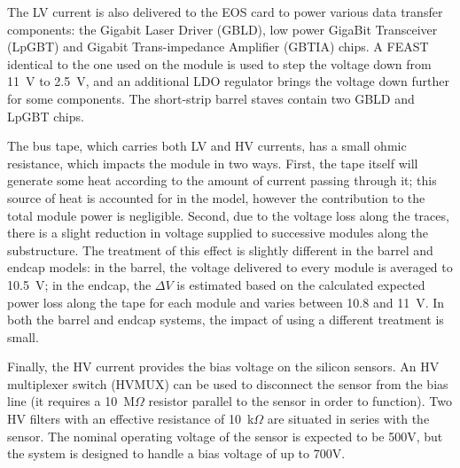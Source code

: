 The LV current is also delivered to the EOS card to power various data transfer components:
the Gigabit Laser Driver (GBLD), low power GigaBit Transceiver (LpGBT) and Gigabit Trans-impedance Amplifier (GBTIA) chips.
A FEAST identical to the one used on the module is used to step the
voltage down from 11~V to 2.5~V, and an additional LDO regulator brings the voltage down further for some components.
The short-strip barrel staves contain two GBLD and LpGBT chips.

The bus tape, which carries both LV and HV currents, has a small ohmic resistance, which impacts the
module in two ways. First,
the tape itself will generate some heat according to the amount of current passing through it; this
source of heat is accounted for in the model, however the contribution to the total module power
is negligible.
Second, due to the voltage loss along the traces, there is a slight reduction in voltage supplied to successive modules along the substructure.
The treatment of this effect is slightly different in the barrel and
endcap models: in the barrel, the voltage delivered to every module is averaged to 10.5~V; in the endcap,
the $\Delta V$ is estimated based on the calculated expected power loss along the tape for each module and varies between 10.8 and 11~V.
In both the barrel and endcap systems, the impact of using a different treatment is small.

Finally, the HV current provides the bias voltage on the silicon sensors. An HV multiplexer
switch (HVMUX) can be used to disconnect the sensor from the
bias line (it requires a 10~M$\Omega$ resistor parallel to the sensor in order to function). Two HV filters with an effective resistance of 10~k$\Omega$ are situated in series with the
sensor. The nominal operating voltage of the sensor is expected to be 500V, but the system is designed
to handle a bias voltage of up to 700V.
